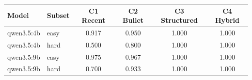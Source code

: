 \begin{tabular}{llcccc}
\toprule
Model & Subset & C1 Recent & C2 Bullet & C3 Structured & C4 Hybrid \\
\midrule
qwen3.5:4b & easy & 0.917 & 0.950 & 1.000 & 1.000 \\
qwen3.5:4b & hard & 0.500 & 0.800 & 1.000 & 1.000 \\
qwen3.5:9b & easy & 0.975 & 0.967 & 1.000 & 1.000 \\
qwen3.5:9b & hard & 0.700 & 0.933 & 1.000 & 1.000 \\
\bottomrule
\end{tabular}
